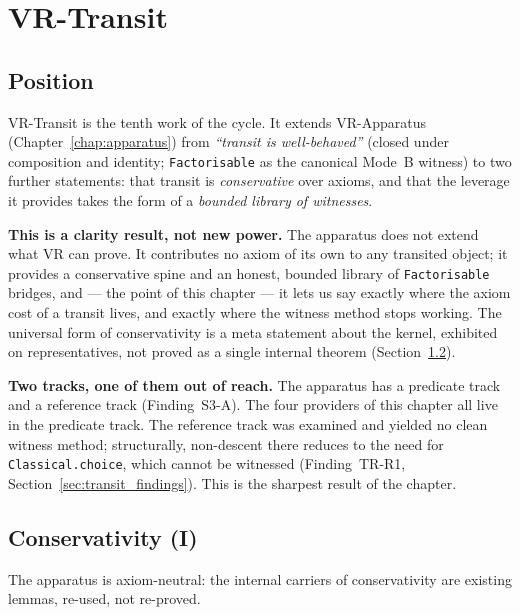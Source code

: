 \chapter{VR-Transit}
\label{chap:transit}

\section{Position}
\label{sec:transit_position}

VR-Transit is the tenth work of the cycle.  It extends VR-Apparatus
(Chapter~\ref{chap:apparatus}) from \emph{``transit is well-behaved''}
(closed under composition and identity; \texttt{Factorisable} as the canonical
Mode~B witness) to two further statements: that transit is \emph{conservative}
over axioms, and that the leverage it provides takes the form of a \emph{bounded
library of witnesses}.

\textbf{This is a clarity result, not new power.}  The apparatus does not extend
what VR can prove.  It contributes no axiom of its own to any transited object;
it provides a conservative spine and an honest, bounded library of
\texttt{Factorisable} bridges, and --- the point of this chapter --- it lets us
say exactly where the axiom cost of a transit lives, and exactly where the
witness method stops working.  The universal form of conservativity is a meta
statement about the kernel, exhibited on representatives, not proved as a single
internal theorem (Section~\ref{sec:transit_conservativity}).

\textbf{Two tracks, one of them out of reach.}  The apparatus has a predicate
track and a reference track (Finding~S3-A).  The four providers of this chapter
all live in the predicate track.  The reference track was examined and yielded no
clean witness method; structurally, non-descent there reduces to the need for
\texttt{Classical.choice}, which cannot be witnessed
(Finding~TR-R1, Section~\ref{sec:transit_findings}).  This is the sharpest result
of the chapter.

\section{Conservativity (I)}
\label{sec:transit_conservativity}

The apparatus is axiom-neutral: the internal carriers of conservativity are
existing \axiomprofile{[]} lemmas, re-used, not re-proved.

